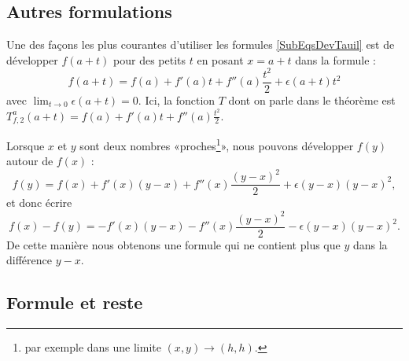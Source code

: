 \subsection{Autres formulations}

\begin{example}		\label{ExempleUtlDev}
	Une des façons les plus courantes d'utiliser les formules \eqref{SubEqsDevTauil} est de développer $f(a+t)$ pour des petits $t$ en posant $x=a+t$ dans la formule :
	\begin{equation}	\label{EqDevfautouraeps}
		f(a+t)=f(a)+f'(a)t+f''(a)\frac{ t^2 }{ 2 }+\epsilon(a+t)t^2
	\end{equation}
	avec $\lim_{t\to 0} \epsilon(a+t)=0$. Ici, la fonction $T$ dont on parle dans le théorème est $T_{f,2}^a(a+t)=f(a)+f'(a)t+f''(a)\frac{ t^2 }{2}$.

	Lorsque $x$ et $y$ sont deux nombres «proches\footnote{par exemple dans une limite $(x,y)\to(h,h)$.}», nous pouvons développer $f(y)$ autour de $f(x)$ :
	\begin{equation}		\label{Eqfydevfx}
		f(y)=f(x)+f'(x)(y-x)+f''(x)\frac{ (y-x)^2 }{ 2 }+\epsilon(y-x)(y-x)^2,
	\end{equation}
	et donc écrire
	\begin{equation}
		f(x)-f(y)=-f'(x)(y-x)-f''(x)\frac{ (y-x)^2 }{ 2 }-\epsilon(y-x)(y-x)^2.
	\end{equation}
	De cette manière nous obtenons une formule qui ne contient plus que $y$ dans la différence $y-x$.
\end{example}

\subsection{Formule et reste}

